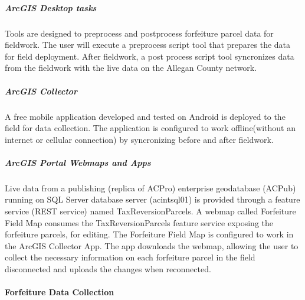 \documentclass[class=article , crop=false, titlepage, twoside, multi={itemize, figure, verbatim}, float=false]{standalone}
\begin{document}
\subparagraph{ArcGIS Desktop tasks}Tools are designed to preprocess and postprocess forfeiture parcel data for fieldwork.  The user will execute a preprocess script tool that prepares the data for field deployment.  After fieldwork, a post process script tool syncronizes data from the fieldwork with the live data on the Allegan County network. 

\subparagraph{ArcGIS Collector}A free mobile application developed and tested on Android is deployed to the field for data collection.  The application is configured to work offline(without an internet or cellular connection) by syncronizing before and after fieldwork.

\subparagraph{ArcGIS Portal Webmaps and Apps}Live data from a publishing (replica of ACPro) enterprise geodatabase (ACPub) running on SQL Server database server (acintsql01) is provided through a feature service (REST service)  named TaxReversionParcels.  A webmap called Forfeiture Field Map consumes the TaxReversionParcels feature service exposing the forfeiture parcels, for editing.  The Forfeiture Field Map is configured to work in the ArcGIS Collector App.  The app downloads the webmap, allowing the user to collect the necessary information on each forfeiture parcel in the field disconnected and uploads the changes when reconnected. 

\paragraph{Forfeiture Data Collection}
\end{document}
